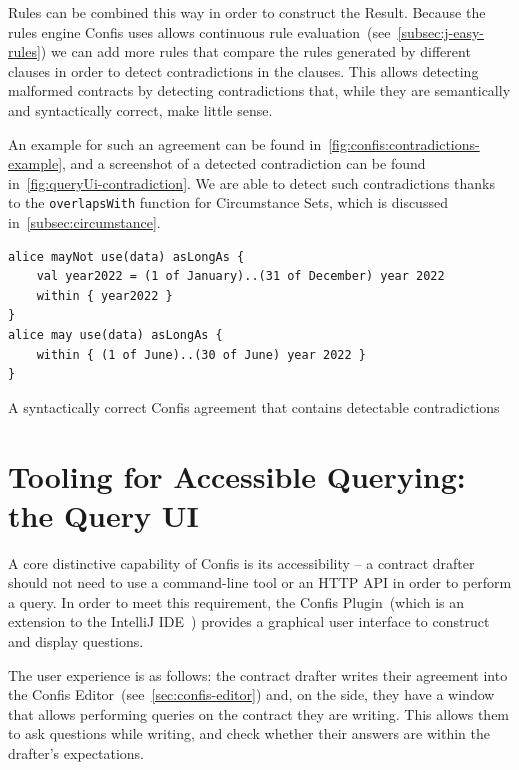 Rules can be combined this way in order to construct the Result.
Because the rules engine Confis uses allows continuous rule evaluation~(see~\autoref{subsec:j-easy-rules}) we can add more rules that compare the rules generated by different clauses in order to detect contradictions in the clauses.
This allows detecting malformed contracts by detecting contradictions that, while they are semantically and syntactically correct, make little sense.

An example for such an agreement can be found in~\autoref{fig:confis:contradictions-example}, and a screenshot of a detected contradiction can be found in~\autoref{fig:queryUi-contradiction}.
We are able to detect such contradictions thanks to the \texttt{overlapsWith} function for Circumstance Sets, which is discussed in~\autoref{subsec:circumstance}.


\begin{listing}[h]
    \centering
    \begin{verbatim}
alice mayNot use(data) asLongAs {
    val year2022 = (1 of January)..(31 of December) year 2022
    within { year2022 }
}
alice may use(data) asLongAs {
    within { (1 of June)..(30 of June) year 2022 }
}
    \end{verbatim}
    \caption{A syntactically correct Confis agreement that contains detectable contradictions}
    \label{fig:confis:contradictions-example}
\end{listing}




\section[Query UI]{Tooling for Accessible Querying: the Query UI}\label{sec:queryUI}

A core distinctive capability of Confis is its accessibility -- a contract drafter should not need to use a command-line tool or an HTTP API in order to perform a query.
In order to meet this requirement, the Confis Plugin~(which is an extension to the IntelliJ IDE~\cite{intelliJRepo, ideaExtensionPoints}) provides a graphical user interface to construct and display questions.

The user experience is as follows: the contract drafter writes their agreement into the Confis Editor~(see~\autoref{sec:confis-editor}) and, on the side, they have a window that allows performing queries on the contract they are writing.
This allows them to ask questions while writing, and check whether their answers are within the drafter's expectations.

